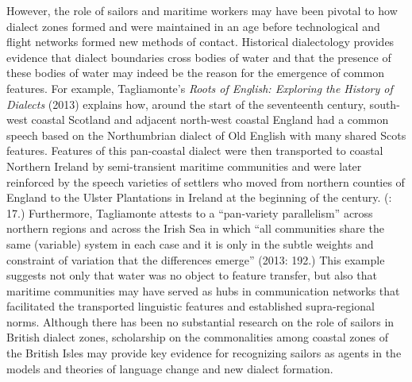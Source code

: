   However, the role of sailors and maritime workers may have been pivotal to how dialect zones formed and were maintained in an age before technological and flight networks formed new methods of contact. Historical dialectology provides evidence that dialect boundaries cross bodies of water and that the presence of these bodies of water may indeed be the reason for the emergence of common features. For example, Tagliamonte’s \textit{Roots of English: Exploring the History of Dialects} (2013) explains how, around the start of the seventeenth century, south-west coastal Scotland and adjacent north-west coastal England had a common speech based on the Northumbrian dialect of Old English with many shared Scots features. Features of this pan-coastal dialect were then transported to coastal Northern Ireland by semi-transient maritime communities and were later reinforced by the speech varieties of settlers who moved from northern counties of England to the Ulster Plantations in Ireland at the beginning of the century. (\citealt{Tagliamonte2013}: 17.) Furthermore, Tagliamonte attests to a “pan-variety parallelism” across northern regions and across the Irish Sea in which “all communities share the same (variable) system in each case and it is only in the subtle weights and constraint of variation that the differences emerge” (2013: 192.) This example suggests not only that water was no object to feature transfer, but also that maritime communities may have served as hubs in communication networks that facilitated the transported linguistic features and established supra-regional norms. Although there has been no substantial research on the role of sailors in British dialect zones, scholarship on the commonalities among coastal zones of the British Isles may provide key evidence for recognizing sailors as agents in the models and theories of language change and new dialect formation. 

